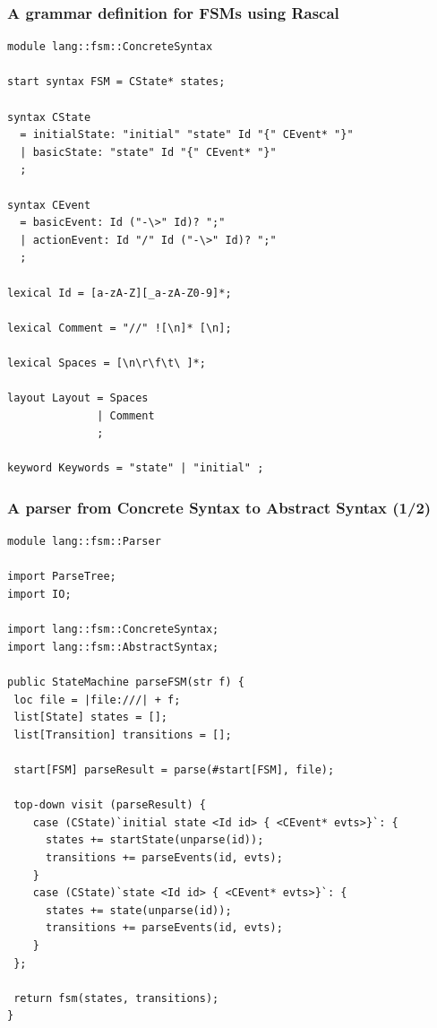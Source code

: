 \documentclass{beamer}
\begin{document}
\begin{frame}[fragile]
\frametitle{A grammar definition for FSMs using Rascal}

\begin{lstlisting}[language=Rascal]
module lang::fsm::ConcreteSyntax

start syntax FSM = CState* states;

syntax CState 
  = initialState: "initial" "state" Id "{" CEvent* "}"
  | basicState: "state" Id "{" CEvent* "}"
  ;

syntax CEvent 
  = basicEvent: Id ("-\>" Id)? ";"
  | actionEvent: Id "/" Id ("-\>" Id)? ";"
  ; 

lexical Id = [a-zA-Z][_a-zA-Z0-9]*; 

lexical Comment = "//" ![\n]* [\n];

lexical Spaces = [\n\r\f\t\ ]*;

layout Layout = Spaces 
              | Comment 
              ; 

keyword Keywords = "state" | "initial" ;
\end{lstlisting} 

\end{frame}

\begin{frame}[fragile]
\frametitle{A parser from Concrete Syntax to Abstract Syntax (1/2)}

\begin{lstlisting}[language=Rascal]
module lang::fsm::Parser

import ParseTree;
import IO;

import lang::fsm::ConcreteSyntax;
import lang::fsm::AbstractSyntax; 

public StateMachine parseFSM(str f) {
 loc file = |file:///| + f;
 list[State] states = [];
 list[Transition] transitions = [];
 
 start[FSM] parseResult = parse(#start[FSM], file);
 
 top-down visit (parseResult) {
    case (CState)`initial state <Id id> { <CEvent* evts>}`: {
      states += startState(unparse(id));
      transitions += parseEvents(id, evts);
    }
    case (CState)`state <Id id> { <CEvent* evts>}`: {
      states += state(unparse(id));
      transitions += parseEvents(id, evts);
    }
 };
 
 return fsm(states, transitions);
}
\end{lstlisting}

\end{frame}
\end{document}
